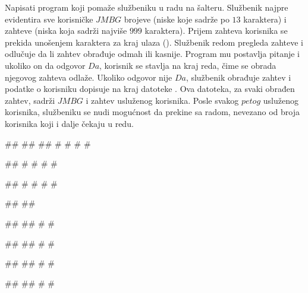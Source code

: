 \begin{Exercise}[label=4_10]
Napisati program koji pomaže službeniku u radu na šalteru.
Službenik najpre evidentira sve korisničke $JMBG$ brojeve (niske koje sadrže po $13$ karaktera) i zahteve (niska koja sadrži najviše $999$ karaktera). 
Prijem zahteva korisnika se prekida unošenjem karaktera za kraj ulaza ().
Službenik redom pregleda zahteve i odlučuje da li zahtev obrađuje odmah ili kasnije. Program mu postavlja pitanje 
 i ukoliko on da odgovor $Da$, 
korisnik se stavlja na kraj reda, čime se obrada njegovog zahteva odlaže. Ukoliko odgovor nije $Da$, službenik obrađuje zahtev i podatke o korisniku dopisuje na kraj datoteke . Ova datoteka, za svaki obrađen zahtev, sadrži $JMBG$ i zahtev usluženog korisnika.
Posle svakog $petog$ usluženog korisnika, službeniku se nudi mogućnost da prekine sa radom, nevezano od broja korisnika koji i dalje čekaju u redu. 

\begin{maxitest}
\begin{upotreba}{1}
#\naslovInt#
## 
##
# #
# #

##
# #
# #

##
# #
# #

##
##

##
##
# #

##
##
# #

##
##
# #

##
##
# #


\end{upotreba}
\end{maxitest}
\end{Exercise}
